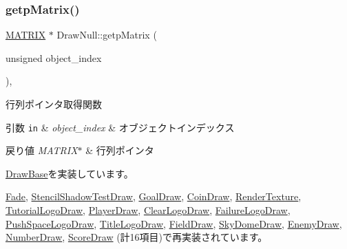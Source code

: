 \subsubsection{\texorpdfstring{getp\+Matrix()}{getpMatrix()}}
{\footnotesize\ttfamily \mbox{\hyperlink{_vector3_d_8h_a032295cd9fb1b711757c90667278e744}{M\+A\+T\+R\+IX}} $\ast$ Draw\+Null\+::getp\+Matrix (\begin{DoxyParamCaption}\item[{unsigned}]{object\+\_\+index }\end{DoxyParamCaption})\hspace{0.3cm}{\ttfamily [override]}, {\ttfamily [virtual]}}



行列ポインタ取得関数 


\begin{DoxyParams}[1]{引数}
\mbox{\tt in}  & {\em object\+\_\+index} & オブジェクトインデックス \\
\hline
\end{DoxyParams}

\begin{DoxyRetVals}{戻り値}
{\em M\+A\+T\+R\+I\+X$\ast$} & 行列ポインタ \\
\hline
\end{DoxyRetVals}


\mbox{\hyperlink{class_draw_base_a60fc3148b2679e4ea7723d2af0c37283}{Draw\+Base}}を実装しています。



\mbox{\hyperlink{class_fade_a2e41a31f9801476e63d2082804375e96}{Fade}}, \mbox{\hyperlink{class_stencil_shadow_test_draw_a8ab105b75d673adc52698a8401c6525c}{Stencil\+Shadow\+Test\+Draw}}, \mbox{\hyperlink{class_goal_draw_a536a23c043576f9032e6651d7644d038}{Goal\+Draw}}, \mbox{\hyperlink{class_coin_draw_ad8cbbe87f4cf4428214f50492c731f5f}{Coin\+Draw}}, \mbox{\hyperlink{class_render_texture_adafb7e9aeea3c298cbfcc71e35ed9457}{Render\+Texture}}, \mbox{\hyperlink{class_tutorial_logo_draw_aade531190180c385c266f5698f99735d}{Tutorial\+Logo\+Draw}}, \mbox{\hyperlink{class_player_draw_a334e94f368f6bd571da866d69333f313}{Player\+Draw}}, \mbox{\hyperlink{class_clear_logo_draw_abcbd0cd8663e0262bcdd83356516082b}{Clear\+Logo\+Draw}}, \mbox{\hyperlink{class_failure_logo_draw_a6e6fb80dc21af9318d659bc3fa71c0b5}{Failure\+Logo\+Draw}}, \mbox{\hyperlink{class_push_space_logo_draw_a9e0875967651293ef97713477334bc2e}{Push\+Space\+Logo\+Draw}}, \mbox{\hyperlink{class_title_logo_draw_a34fa4366f1ff190a08a36f8e402f6941}{Title\+Logo\+Draw}}, \mbox{\hyperlink{class_field_draw_ad399978201f737f4c0dd2b3990fa6b34}{Field\+Draw}}, \mbox{\hyperlink{class_sky_dome_draw_accbc05d1bbde9ad9d6b7180d91e9ed89}{Sky\+Dome\+Draw}}, \mbox{\hyperlink{class_enemy_draw_afbb8ac19041abda280ece7737103dc66}{Enemy\+Draw}}, \mbox{\hyperlink{class_number_draw_a2ea44b362c3a018faf46905d0f755410}{Number\+Draw}}, \mbox{\hyperlink{class_score_draw_adb995c83624c2eab8b8a15d1182df5b8}{Score\+Draw}} (計16項目)で再実装されています。



